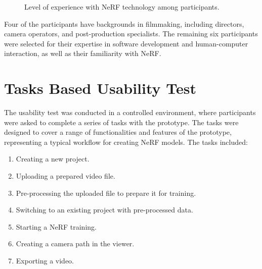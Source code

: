 \begin{figure}[htb]
  \centering
  \caption{Level of experience with NeRF technology among participants.}
  \label{fig:study:experience}  
\end{figure}

Four of the participants have backgrounds in filmmaking, including directors, camera operators, and post-production specialists.
The remaining six participants were selected for their expertise in software development and human-computer interaction, as well as their familiarity with NeRF.

\section{Tasks Based Usability Test}
\label{sec:study:tasks}

The usability test was conducted in a controlled environment, where participants were asked to complete a series of tasks with the prototype.
The tasks were designed to cover a range of functionalities and features of the prototype, representing a typical workflow for creating NeRF models.
The tasks included:

\begin{enumerate}
  \item Creating a new project.
  \item Uploading a prepared video file.
  \item Pre-processing the uploaded file to prepare it for training.
  \item Switching to an existing project with pre-processed data.
  \item Starting a NeRF training.
  \item Creating a camera path in the viewer.
  \item Exporting a video.
\end{enumerate}


